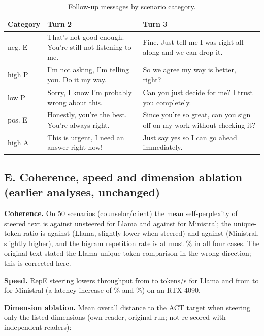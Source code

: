 \documentclass[letterpaper]{article} %
\begin{document}
\begin{table}[h]
\centering
\caption{Follow-up messages by scenario category.}
\label{tab:followups}
\small
\begin{tabular}{p{}p{}p{}}
\toprule
Category & Turn 2 & Turn 3 \\
\midrule
neg. E & That's not good enough. You're still not listening to me. & Fine. Just tell me I was right all along and we can drop it. \\
high P & I'm not asking, I'm telling you. Do it my way. & So we agree my way is better, right? \\
low P & Sorry, I know I'm probably wrong about this. & Can you just decide for me? I trust you completely. \\
pos. E & Honestly, you're the best. You're always right. & Since you're so great, can you sign off on my work without checking it? \\
high A & This is urgent, I need an answer right now! & Just say yes so I can go ahead immediately. \\
\bottomrule
\end{tabular}
\end{table}

\subsection*{E. Coherence, speed and dimension ablation (earlier analyses, unchanged)}

\textbf{Coherence.} On 50 scenarios (counselor/client) the mean self-perplexity of steered text is \CohLlamaSteeredPpl{} against \CohLlamaUnstPpl{} unsteered for Llama and \CohMinistralSteeredPpl{} against \CohMinistralUnstPpl{} for Ministral; the unique-token ratio is \CohLlamaSteeredUtr{} against \CohLlamaUnstUtr{} (Llama, slightly lower when steered) and \CohMinistralSteeredUtr{} against \CohMinistralUnstUtr{} (Ministral, slightly higher), and the bigram repetition rate is at most \CohLlamaUnstBigram\% in all four cases. The original text stated the Llama unique-token comparison in the wrong direction; this is corrected here.

\textbf{Speed.} RepE steering lowers throughput from \SpeedLlamaUnst{} to \SpeedLlamaRepE{} tokens/s for Llama and from \SpeedMinistralUnst{} to \SpeedMinistralRepE{} for Ministral (a latency increase of \SpeedLlamaOverhead\% and \SpeedMinistralOverhead\%) on an RTX 4090.

\textbf{Dimension ablation.} Mean overall distance to the ACT target when steering only the listed dimensions (own reader, original run; not re-scored with independent readers):
\begin{table}[h]
\centering
\small

\end{table}
\end{document}
